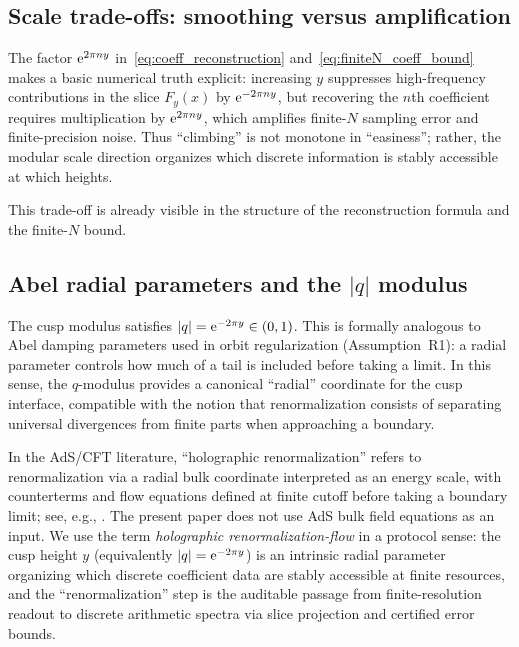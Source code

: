\subsection{Scale trade-offs: smoothing versus amplification}
\label{sec:scale_tradeoffs}

The factor $\mathrm{e}^{2\pi n y}$ in~\eqref{eq:coeff_reconstruction} and~\eqref{eq:finiteN_coeff_bound} makes a basic numerical truth explicit: increasing $y$ suppresses high-frequency contributions in the slice $F_y(x)$ by $\mathrm{e}^{-2\pi n y}$, but recovering the $n$th coefficient requires multiplication by $\mathrm{e}^{2\pi n y}$, which amplifies finite-$N$ sampling error and finite-precision noise. Thus ``climbing'' is not monotone in ``easiness''; rather, the modular scale direction organizes which discrete information is stably accessible at which heights.
\par
This trade-off is already visible in the structure of the reconstruction formula and the finite-$N$ bound.

\subsection{Abel radial parameters and the \texorpdfstring{$|q|$}{|q|} modulus}
\label{sec:abel_q_modulus}

The cusp modulus satisfies $|q|=\mathrm{e}^{-2\pi y}\in(0,1)$. This is formally analogous to Abel damping parameters used in orbit regularization (Assumption~R1): a radial parameter controls how much of a tail is included before taking a limit. In this sense, the $q$-modulus provides a canonical ``radial'' coordinate for the cusp interface, compatible with the notion that renormalization consists of separating universal divergences from finite parts when approaching a boundary.

\begin{remark}
In the AdS/CFT literature, ``holographic renormalization'' refers to renormalization via a radial bulk coordinate interpreted as an energy scale, with counterterms and flow equations defined at finite cutoff before taking a boundary limit; see, e.g., \cite{Skenderis2002}.
The present paper does not use AdS bulk field equations as an input. We use the term \emph{holographic renormalization-flow} in a protocol sense: the cusp height $y$ (equivalently $|q|=\mathrm{e}^{-2\pi y}$) is an intrinsic radial parameter organizing which discrete coefficient data are stably accessible at finite resources, and the ``renormalization'' step is the auditable passage from finite-resolution readout to discrete arithmetic spectra via slice projection and certified error bounds.
\end{remark}


